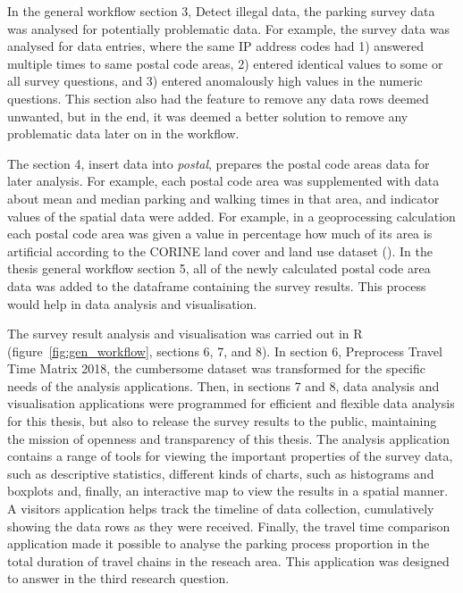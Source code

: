 In the general workflow section 3, Detect illegal data, the parking survey data was analysed for potentially problematic data. For example, the survey data was analysed for data entries, where the same IP address codes had 1) answered multiple times to same postal code areas, 2) entered identical values to some or all survey questions, and 3) entered anomalously high values in the numeric questions. This section also had the feature to remove any data rows deemed unwanted, but in the end, it was deemed a better solution to remove any problematic data later on in the workflow. 

The section 4, insert data into \textit{postal}, prepares the postal code areas data for later analysis. For example, each postal code area was supplemented with data about mean and median parking and walking times in that area, and indicator values of the spatial data were added. For example, in a geoprocessing calculation each postal code area was given a value in percentage how much of its area is artificial according to the CORINE land cover and land use dataset (\cite{FinnishEnvironmentInstitute2018}). In the thesis general workflow section 5, all of the newly calculated postal code area data was added to the dataframe containing the survey results. This process would help in data analysis and visualisation.

The survey result analysis and visualisation was carried out in R (figure~\ref{fig:gen_workflow}, sections 6, 7, and 8). In section 6, Preprocess Travel Time Matrix 2018, the cumbersome dataset was transformed for the specific needs of the analysis applications. Then, in sections 7 and 8, data analysis and visualisation applications were programmed for efficient and flexible data analysis for this thesis, but also to release the survey results to the public, maintaining the mission of openness and transparency of this thesis. The analysis application contains a range of tools for viewing the important properties of the survey data, such as descriptive statistics, different kinds of charts, such as histograms and boxplots and, finally, an interactive map to view the results in a spatial manner. A visitors application helps track the timeline of data collection, cumulatively showing the data rows as they were received. Finally, the travel time comparison application made it possible to analyse the parking process proportion in the total duration of travel chains in the reseach area. This application was designed to answer in the third research question.

